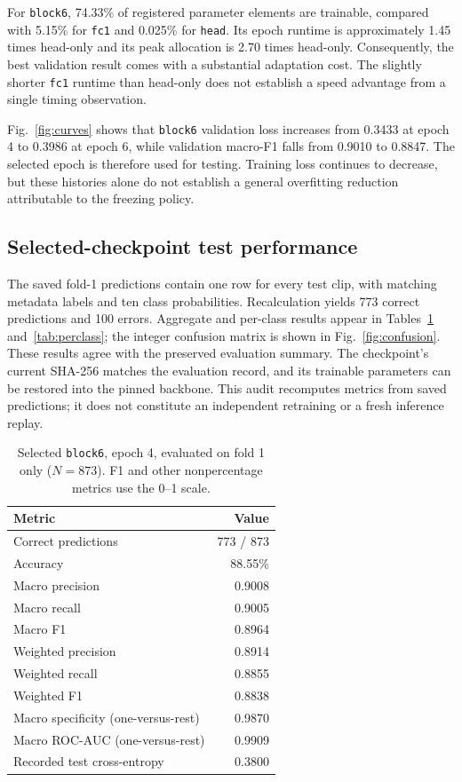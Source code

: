 \documentclass[conference]{IEEEtran}
\newcommand{\code}[1]{\texttt{#1}}
\begin{document}
For \code{block6}, 74.33\% of registered parameter elements are trainable, compared with 5.15\% for \code{fc1} and 0.025\% for \code{head}. Its epoch runtime is approximately 1.45 times head-only and its peak allocation is 2.70 times head-only. Consequently, the best validation result comes with a substantial adaptation cost. The slightly shorter \code{fc1} runtime than head-only does not establish a speed advantage from a single timing observation.

Fig.~\ref{fig:curves} shows that \code{block6} validation loss increases from 0.3433 at epoch 4 to 0.3986 at epoch 6, while validation macro-F1 falls from 0.9010 to 0.8847. The selected epoch is therefore used for testing. Training loss continues to decrease, but these histories alone do not establish a general overfitting reduction attributable to the freezing policy.

\subsection{Selected-checkpoint test performance}
The saved fold-1 predictions contain one row for every test clip, with matching metadata labels and ten class probabilities. Recalculation yields 773 correct predictions and 100 errors. Aggregate and per-class results appear in Tables~\ref{tab:results} and~\ref{tab:perclass}; the integer confusion matrix is shown in Fig.~\ref{fig:confusion}. These results agree with the preserved evaluation summary. The checkpoint's current SHA-256 matches the evaluation record, and its trainable parameters can be restored into the pinned backbone. This audit recomputes metrics from saved predictions; it does not constitute an independent retraining or a fresh inference replay.

\begin{table}[t]
\centering\caption{Selected \code{block6}, epoch 4, evaluated on fold 1 only ($N=873$). F1 and other nonpercentage metrics use the 0--1 scale.}\label{tab:results}
\footnotesize
\begin{tabular}{@{}l r@{}}\toprule
Metric & Value\\\midrule
Correct predictions & 773 / 873\\
Accuracy & 88.55\%\\
Macro precision & 0.9008\\
Macro recall & 0.9005\\
Macro F1 & 0.8964\\
Weighted precision & 0.8914\\
Weighted recall & 0.8855\\
Weighted F1 & 0.8838\\
Macro specificity (one-versus-rest) & 0.9870\\
Macro ROC-AUC (one-versus-rest) & 0.9909\\
Recorded test cross-entropy & 0.3800\\\bottomrule
\end{tabular}
\end{table}
\end{document}
